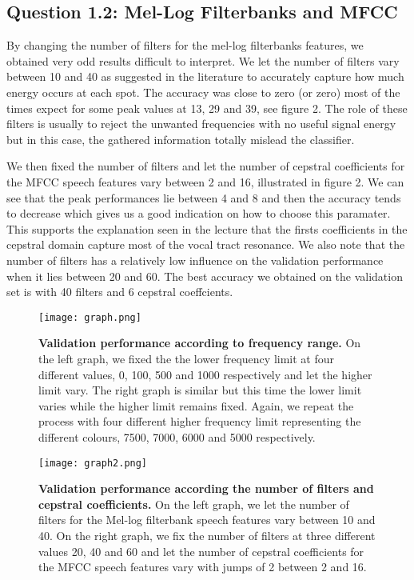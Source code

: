 \documentclass[9pt,twocolumn,letterpaper]{article}
\begin{document}
\subsection{Question 1.2: Mel-Log Filterbanks and MFCC}
By changing the number of filters for the mel-log filterbanks features, we obtained very odd results difficult to interpret. We let the number of filters vary between 10 and 40 as suggested in the literature to accurately capture how much energy occurs at each spot. The accuracy was close to zero (or zero) most of the times expect for some peak values at 13, 29 and 39, see figure 2. The role of these filters is usually to reject the unwanted frequencies with no useful signal energy but in this case, the gathered information totally mislead the classifier.\par
We then fixed the number of filters and let the number of cepstral coefficients for the MFCC speech features vary between 2 and 16, illustrated in figure 2. We can see that the peak performances lie between 4 and 8 and then the accuracy tends to decrease which gives us a good indication on how to choose this paramater. This supports the explanation seen in the lecture that the firsts coefficients in the cepstral domain capture most of the vocal tract resonance. We also note that the number of filters has a relatively low influence on the validation performance when it lies between 20 and 60. The best accuracy we obtained on the validation set is with 40 filters and 6 cepstral coeffcients.

\begin{figure*}
\begin{center}
\texttt{[image: graph.png]}
\end{center}
   \caption{{\bfseries Validation performance according to frequency range.} On the left graph, we fixed the the lower frequency limit at four different values, 0, 100, 500 and 1000 respectively and let the higher limit vary. The right graph is similar but this time the lower limit varies while the higher limit remains fixed. Again, we repeat the process with four different higher frequency limit representing the different colours, 7500, 7000, 6000 and 5000 respectively. }
\label{fig:short}
\end{figure*}
\begin{figure*}
\begin{center}
\texttt{[image: graph2.png]}
\end{center}
   \caption{{\bfseries Validation performance according the number of filters and cepstral coefficients.} On the left graph, we let the number of filters for the Mel-log filterbank speech features vary between 10 and 40. On the right graph, we fix the number of filters at three different values 20, 40 and 60 and let the number of cepstral coefficients for the MFCC speech features vary with jumps of 2 between 2 and 16.}
\label{fig:short}
\end{figure*}
\end{document}
